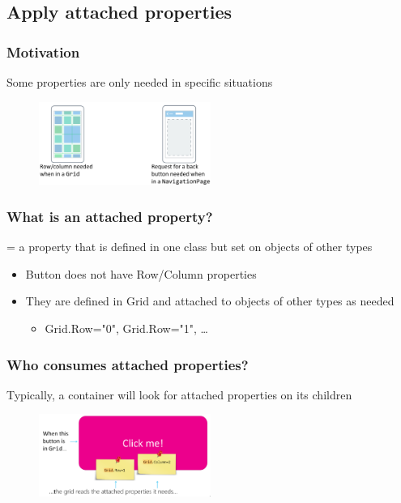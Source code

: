 \documentclass{article}
\begin{document}
\subsection{Apply attached properties}

\subsubsection{Motivation}

Some properties are only needed in specific situations

\begin{figure}[H]
    \centering
    \includegraphics[width=0.5\textwidth]{xaml-attachedproperties.png}
    \caption{}
\end{figure}

\subsubsection{What is an attached property?}

= a property that is defined in one class but set on objects of other types

\begin{itemize}
    \item Button does not have Row/Column properties
    \item They are defined in Grid and attached to objects of other types as needed
    \begin{itemize}
        \item Grid.Row="0", Grid.Row="1", \dots
    \end{itemize}
\end{itemize}

\subsubsection{Who consumes attached properties?}

Typically, a container will look for attached properties on its children

\begin{figure}[H]
    \centering
    \includegraphics[width=0.5\textwidth]{xaml-attachedproperties2.png}
    \caption{}
\end{figure}
\end{document}
